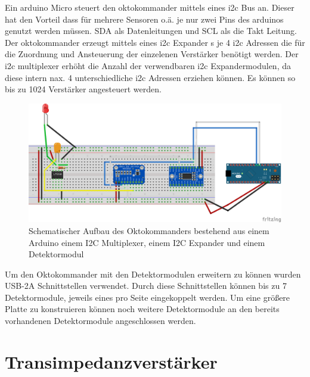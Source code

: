 Ein arduino Micro steuert den oktokommander mittels eines i2c Bus an. Dieser hat den Vorteil dass für mehrere Sensoren o.ä. je nur zwei Pins des arduinos genutzt werden müssen. SDA als Datenleitungen und SCL als die Takt Leitung.
Der oktokommander erzeugt mittels eines i2c Expander s je 4 i2c Adressen die für die Zuordnung und Ansteuerung der einzelenen Verstärker benötigt werden.
Der i2c multiplexer erhöht die Anzahl der verwendbaren i2c Expandermodulen, da diese intern nax. 4 unterschiedliche i2c Adressen erziehen können. Es können so bis zu 1024 Verstärker angesteuert werden.\newline
\begin{figure}[h]
	\centering
	\includegraphics[scale=0.5]{../figures/oktokommander.png}
	\caption{Schematischer Aufbau des Oktokommanders bestehend aus einem Arduino einem I2C Multiplexer, einem I2C Expander und einem Detektormodul}
	\label{fig:oktokommander}
\end{figure}
Um den Oktokommander mit den Detektormodulen erweitern zu können wurden USB-2A Schnittstellen verwendet. Durch diese Schnittstellen können bis zu 7 Detektormodule, jeweils eines pro Seite  eingekoppelt werden. Um eine größere Platte zu konstruieren können noch weitere Detektormodule an den bereits vorhandenen Detektormodule angeschlossen werden.
\newpage



\section{Transimpedanzverstärker}
\label{sec:Transimpedanzverstärker}

